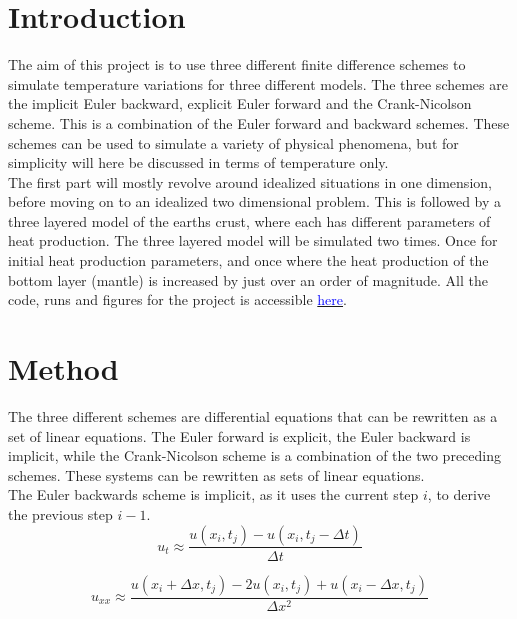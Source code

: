\documentclass[10pt,a4paper]{article}
\begin{document}
\newpage
\section*{Introduction}
The aim of this project is to use three different finite difference schemes to simulate temperature variations for three different models. The three schemes are the implicit Euler backward, explicit Euler forward and the Crank-Nicolson scheme. This is a combination of the Euler forward and backward schemes. These schemes can be used to simulate a variety of physical phenomena, but for simplicity will here be discussed in terms of temperature only.\\ 

\noindent The first part will mostly revolve around idealized situations in one dimension, before moving on to an idealized two dimensional problem. This is followed by a three layered model of the earths crust, where each has different parameters of heat production. The three layered model will be simulated two times. Once for initial heat production parameters, and once where the heat production of the bottom layer (mantle) is increased by just over an order of magnitude. All the code, runs and figures for the project is accessible \href{https://github.com/VemundStenbekkThorkildsen/Assignment5}{\textcolor{blue}{here}}.  



\section*{Method}

\noindent The three different schemes are differential equations that can be rewritten as a set of linear equations. The Euler forward is explicit, the Euler backward is implicit, while the Crank-Nicolson scheme is a combination of the two preceding schemes. These systems can be rewritten as sets of linear equations. \\


\noindent The Euler backwards scheme is implicit, as it uses the current step $i$, to derive the previous step $i-1$. 
\\
\begin{equation}
u_t \approx \frac{u(x_i,t_j) - u(x_i,t_j - \Delta t)}{\Delta t}
\end{equation}

\begin{equation}
u_{xx} \approx \frac{u(x_i + \Delta x,t_j) - 2u(x_i,t_j) + u(x_i - \Delta x,t_j)}{\Delta x^2}
\end{equation}
\end{document}
